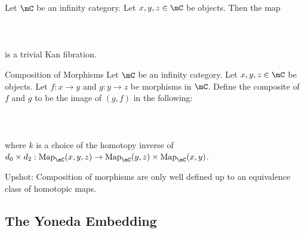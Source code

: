 \documentclass[a4paper]{article}
\begin{document}
\begin{lmm}{}{} Let $\mC$ be an infinity category. Let $x,y,z\in\mC$ be objects. Then the map \\~\\
\\~\\
is a trivial Kan fibration. 
\end{lmm}

\begin{defn}{Composition of Morphisms}{} Let $\mC$ be an infinity category. Let $x,y,z\in\mC$ be objects. Let $f:x\to y$ and $g:y\to z$ be morphisms in $\mC$. Define the composite of $f$ and $g$ to be the image of $(g,f)$ in the following: \\~\\
\\~\\
where $k$ is a choice of the homotopy inverse of $d_0\times d_2:\text{Map}_\mC(x,y,z)\to\text{Map}_\mC(y,z)\times\text{Map}_\mC(x,y)$. 
\end{defn}

Upshot: Composition of morphisms are only well defined up to an equivalence class of homotopic maps. 

\subsection{The Yoneda Embedding}

\pagebreak
\end{document}
